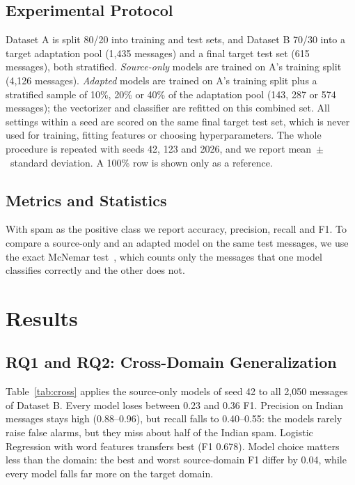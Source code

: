 \documentclass[conference]{IEEEtran}
\begin{document}
\subsection{Experimental Protocol}
Dataset A is split 80/20 into training and test sets, and Dataset B 70/30 into a target adaptation pool (1,435 messages) and a final target test set (615 messages), both stratified. \emph{Source-only} models are trained on A's training split (4,126 messages). \emph{Adapted} models are trained on A's training split plus a stratified sample of 10\%, 20\% or 40\% of the adaptation pool (143, 287 or 574 messages); the vectorizer and classifier are refitted on this combined set. All settings within a seed are scored on the same final target test set, which is never used for training, fitting features or choosing hyperparameters. The whole procedure is repeated with seeds 42, 123 and 2026, and we report mean~$\pm$~standard deviation. A 100\% row is shown only as a reference.

\subsection{Metrics and Statistics}
With spam as the positive class we report accuracy, precision, recall and F1. To compare a source-only and an adapted model on the same test messages, we use the exact McNemar test~\cite{mcnemar1947,dietterich1998}, which counts only the messages that one model classifies correctly and the other does not.

\section{Results}
\subsection{RQ1 and RQ2: Cross-Domain Generalization}
Table~\ref{tab:cross} applies the source-only models of seed 42 to all 2,050 messages of Dataset B. Every model loses between 0.23 and 0.36 F1. Precision on Indian messages stays high (0.88--0.96), but recall falls to 0.40--0.55: the models rarely raise false alarms, but they miss about half of the Indian spam. Logistic Regression with word features transfers best (F1 0.678). Model choice matters less than the domain: the best and worst source-domain F1 differ by 0.04, while every model falls far more on the target domain.
\end{document}
